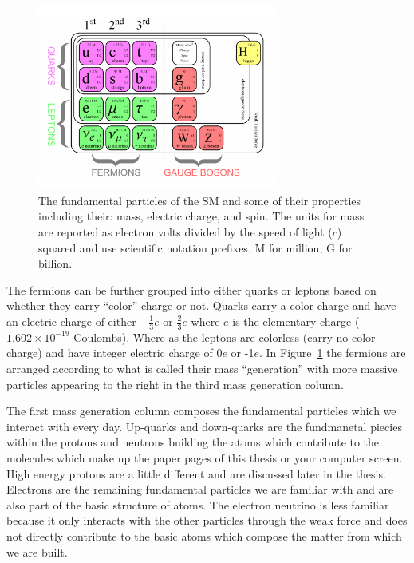 \begin{figure}[htbp]
\centering
     \includegraphics[width=0.7\textwidth]{introduction/plots/sm_particles.pdf}
     \caption{
The fundamental particles of the SM and some of their properties including their:
mass, electric charge, and spin. The units for mass are reported as electron volts divided by
the speed of light ($c$) squared and use scientific notation prefixes.
M for million, G for billion.
     }
     \label{fig:sm_particles}
\end{figure}

The fermions can be further grouped into either quarks or leptons based on whether
they carry ``color'' charge or not. 
Quarks carry a color charge and have an electric charge of either $-\frac{1}{3}e$ or $\frac{2}{3}e$
where $e$ is the elementary charge ($1.602 \times 10^{-19}$ Coulombs).
Where as the leptons are colorless (carry no color charge) and
have integer electric charge of 0$e$ or -1$e$. In Figure~\ref{fig:sm_particles} the fermions are
arranged according to what is called their mass ``generation'' with more massive
particles appearing to the right in the third mass generation column.

The first
mass generation column composes the fundamental particles which we interact with
every day. Up-quarks and down-quarks are the fundmanetal piecies within
the protons and neutrons building the atoms which contribute to the molecules which
make up the paper pages of this thesis or your computer screen. High energy protons
are a little different and are discussed later in the thesis. Electrons are the
remaining fundamental particles we are familiar with and are also part of the basic 
structure of atoms. The electron neutrino is less familiar because it only
interacts with the other particles through the weak force and does not directly
contribute to the basic atoms which compose the matter from which we are built.

